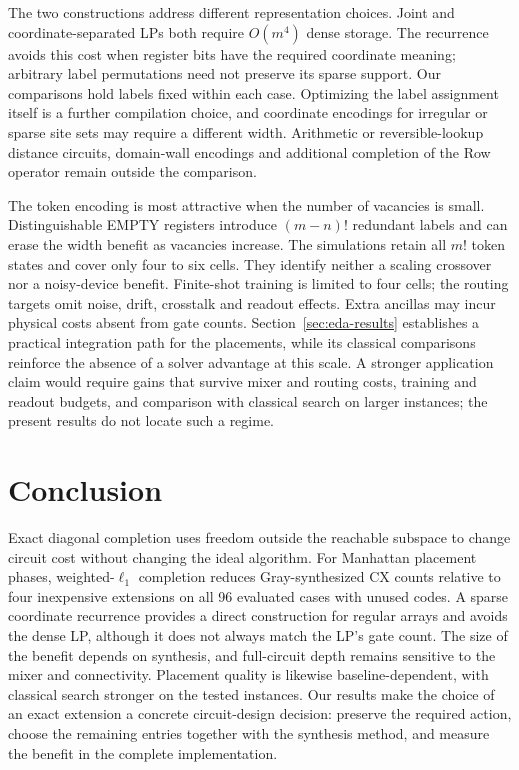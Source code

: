 \documentclass[manuscript,screen,review]{acmart}
\begin{document}
The two constructions address different representation choices. Joint and
coordinate-separated LPs both require $O(m^4)$ dense storage. The recurrence
avoids this cost when register bits have the required coordinate meaning;
arbitrary label permutations need not preserve its sparse support. Our
comparisons hold labels fixed within each case. Optimizing the label
assignment itself is a further compilation choice, and coordinate encodings
for irregular or sparse site sets may require a different width. Arithmetic
or reversible-lookup distance circuits, domain-wall encodings and additional
completion of the Row operator remain outside the comparison.

The token encoding is most attractive when the number of vacancies is small.
Distinguishable EMPTY registers introduce $(m-n)!$ redundant labels and can
erase the width benefit as vacancies increase. The simulations retain all
$m!$ token states and cover only four to six cells. They identify neither
a scaling crossover nor a noisy-device benefit. Finite-shot training is
limited to four cells; the routing targets omit noise, drift, crosstalk and
readout effects. Extra ancillas may incur physical costs absent from gate
counts. Section~\ref{sec:eda-results} establishes a practical integration
path for the placements, while its classical comparisons reinforce the
absence of a solver advantage at this scale. A stronger application claim
would require gains that survive mixer and routing costs, training and
readout budgets, and comparison with classical search on larger instances;
the present results do not locate such a regime.

\section{Conclusion}
Exact diagonal completion uses freedom outside the reachable subspace to
change circuit cost without changing the ideal algorithm. For Manhattan
placement phases, weighted-$\ell_1$ completion reduces Gray-synthesized CX
counts relative to four inexpensive extensions on all 96 evaluated cases
with unused codes. A sparse coordinate recurrence provides a direct
construction for regular arrays and avoids the dense LP, although it does
not always match the LP's gate count. The size of the benefit depends on
synthesis, and full-circuit depth remains sensitive to the mixer and
connectivity. Placement quality is likewise baseline-dependent, with
classical search stronger on the tested instances. Our results make the
choice of an exact extension a concrete circuit-design decision: preserve
the required action, choose the remaining entries together with the
synthesis method, and measure the benefit in the complete implementation.
\end{document}
